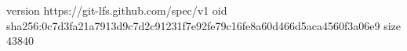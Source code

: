 version https://git-lfs.github.com/spec/v1
oid sha256:0c7d3fa21a7913d9c7d2c91231f7e92fe79c16fe8a60d466d5aca4560f3a06e9
size 43840
